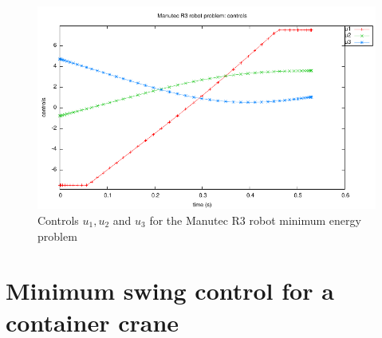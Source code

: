 \documentclass[a4paper,11pt]{report}    %
\begin{document}
\begin{figure}
  \centering 
  \includegraphics{../examples/manutec/controls}
  \caption{Controls $ u_1,  u_2$ and $u_3$ for the Manutec R3 robot minimum energy  problem}
 \label{fig:manutec_controls}
\end{figure}



\section{Minimum swing control for a container crane}
\end{document}
